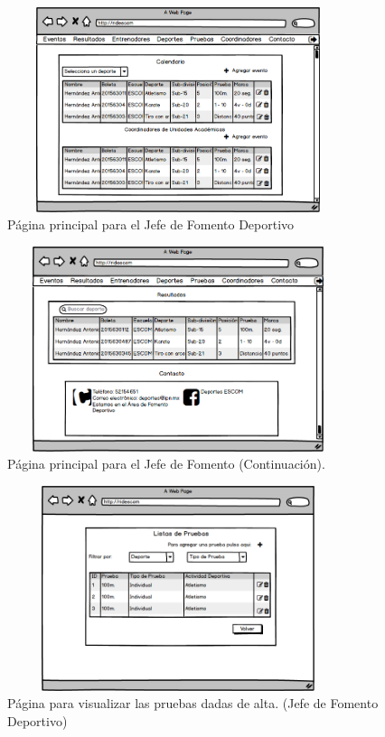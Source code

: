 		\begin{figure}[hbt!]
			\centering
			\includegraphics[width=10cm, height=6cm]{Imagenes/Nuevos/P2_Inicio_JefeFD}
			\caption{Página principal para el Jefe de Fomento Deportivo}
			\label{principalJFD}
		\end{figure}
	
		\begin{figure} [hbt!]
			\centering
			\includegraphics[width=10cm, height=6cm]{Imagenes/Nuevos/P3_Inicio_JefeFD1}
			\caption{Página principal para el Jefe de Fomento (Continuación).}
			\label{principalJFD1}
		\end{figure}
	
		\begin{figure} [hbt!]
			\centering
			\includegraphics[width=10cm, height=6cm]{Imagenes/Nuevos/P25_Pruebas_JFD}
			\caption{Página para visualizar las pruebas dadas de alta. (Jefe de Fomento Deportivo)}
			\label{pruebas}
		\end{figure}
		\pagebreak
		
